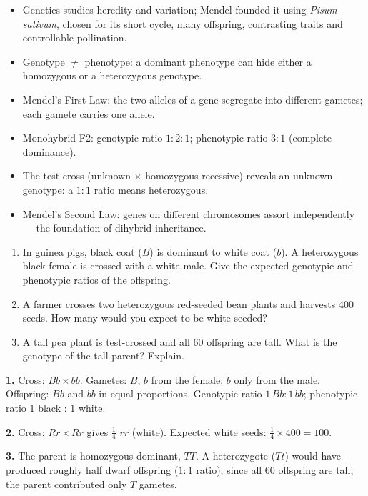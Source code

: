 \documentclass[11pt]{article}
\begin{document}
\begin{aretenir}
\begin{itemize}
\item Genetics studies heredity and variation; Mendel founded it using \emph{Pisum sativum}, chosen for its short cycle, many offspring, contrasting traits and controllable pollination.
\item Genotype $\neq$ phenotype: a dominant phenotype can hide either a homozygous or a heterozygous genotype.
\item Mendel's First Law: the two alleles of a gene segregate into different gametes; each gamete carries one allele.
\item Monohybrid F2: genotypic ratio $1:2:1$; phenotypic ratio $3:1$ (complete dominance).
\item The test cross (unknown $\times$ homozygous recessive) reveals an unknown genotype: a $1:1$ ratio means heterozygous.
\item Mendel's Second Law: genes on different chromosomes assort independently --- the foundation of dihybrid inheritance.
\end{itemize}
\end{aretenir}

\begin{exercice}[Practice]
\begin{enumerate}
\item In guinea pigs, black coat ($B$) is dominant to white coat ($b$). A heterozygous black female is crossed with a white male. Give the expected genotypic and phenotypic ratios of the offspring.
\item A farmer crosses two heterozygous red-seeded bean plants and harvests 400 seeds. How many would you expect to be white-seeded?
\item A tall pea plant is test-crossed and all 60 offspring are tall. What is the genotype of the tall parent? Explain.
\end{enumerate}
\end{exercice}

\begin{corrige}[Exercise 1]
\textbf{1.} Cross: $Bb \times bb$. Gametes: $B$, $b$ from the female; $b$ only from the male. Offspring: $Bb$ and $bb$ in equal proportions. Genotypic ratio $1\,Bb : 1\,bb$; phenotypic ratio $1$ black : $1$ white.\par
\textbf{2.} Cross: $Rr \times Rr$ gives $\tfrac{1}{4}$ $rr$ (white). Expected white seeds: $\tfrac{1}{4} \times 400 = 100$.\par
\textbf{3.} The parent is homozygous dominant, $TT$. A heterozygote ($Tt$) would have produced roughly half dwarf offspring ($1:1$ ratio); since all 60 offspring are tall, the parent contributed only $T$ gametes.
\end{corrige}
\end{document}
